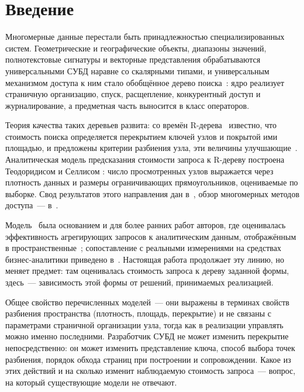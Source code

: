\section{Введение}

Многомерные данные перестали быть принадлежностью специализированных систем.
Геометрические и географические объекты, диапазоны значений, полнотекстовые
сигнатуры и векторные представления обрабатываются универсальными СУБД наравне
со скалярными типами, и универсальным механизмом доступа к ним стало обобщённое
дерево поиска~\cite{hellerstein1995generalized}: ядро реализует страничную
организацию, спуск, расщепление, конкурентный доступ и журналирование, а
предметная часть выносится в класс операторов.

Теория качества таких деревьев развита: со времён R-дерева~\cite{guttman1984r}
известно, что стоимость поиска определяется перекрытием ключей узлов и покрытой
ими площадью, и предложены критерии разбиения узла, эти величины
улучшающие~\cite{beckmann1990rstar,beckmann2009rrstar}. Аналитическая модель
предсказания стоимости запроса к R-дереву построена Теодоридисом и Селлисом
\cite{theodoridis1996model}: число просмотренных узлов выражается через
плотность данных и размеры ограничивающих прямоугольников, оцениваемые по
выборке. Свод результатов этого направления дан
в~\cite{manolopoulos2006rtrees}, обзор многомерных методов доступа~---
в~\cite{gaede1998multidimensional}.

Модель~\cite{theodoridis1996model} была основанием и для более ранних работ
авторов, где оценивалась эффективность агрегирующих запросов к аналитическим
данным, отображённым в пространственные~\cite{borodin2009rtree,
borodin2011estimation, borodin2012monograph}; сопоставление с реальными
измерениями на средствах бизнес-аналитики приведено в~\cite{borodin2010bi}.
Настоящая работа продолжает эту линию, но меняет предмет: там оценивалась
стоимость запроса к дереву заданной формы, здесь~--- зависимость этой формы от
решений, принимаемых реализацией.

Общее свойство перечисленных моделей~--- они выражены в терминах свойств
разбиения пространства (плотность, площадь, перекрытие) и не связаны с
параметрами страничной организации узла, тогда как в реализации управлять можно
именно последними. Разработчик СУБД не может
изменить перекрытие непосредственно: он может изменить представление ключа,
способ выбора точек разбиения, порядок обхода страниц при построении и
сопровождении. Какое из этих действий и на сколько изменит наблюдаемую
стоимость запроса~--- вопрос, на который существующие модели не отвечают.

